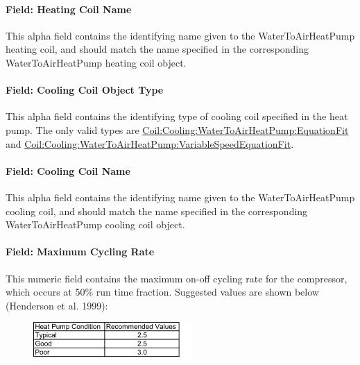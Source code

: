 \paragraph{Field: Heating Coil Name}\label{field-heating-coil-name-5-000}

This alpha field contains the identifying name given to the WaterToAirHeatPump heating coil, and should match the name specified in the corresponding WaterToAirHeatPump heating coil object.

\paragraph{Field: Cooling Coil Object Type}\label{field-cooling-coil-object-type-5-000}

This alpha field contains the identifying type of cooling coil specified in the heat pump. The only valid types are \hyperref[coilcoolingwatertoairheatpumpequationfit]{Coil:Cooling:WaterToAirHeatPump:EquationFit} and \hyperref[coilcoolingwatertoairheatpumpvariablespeedequationfit]{Coil:Cooling:WaterToAirHeat\hyperref[pumpvariablespeed]{Pump:VariableSpeed}EquationFit}.

\paragraph{Field: Cooling Coil Name}\label{field-cooling-coil-name-4-000}

This alpha field contains the identifying name given to the WaterToAirHeatPump cooling coil, and should match the name specified in the corresponding WaterToAirHeatPump cooling coil object.

\paragraph{Field: Maximum Cycling Rate}\label{field-maximum-cycling-rate-002}

This numeric field contains the maximum on-off cycling rate for the compressor, which occurs at 50\% run time fraction. Suggested values are shown below (Henderson et al. 1999):

\begin{figure}[htbp]
\centering
\includegraphics{media/image289.png}
\caption{}
\end{figure}

